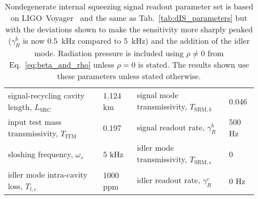 \begin{table}
\centering
\begin{tabular}{@{}ll|ll@{}}
\toprule
signal-recycling cavity length, $L_\text{SRC}$ & 1.124 km & signal mode transmissivity, $T_{\text{SRM},b}$ & 0.046 \\
input test mass transmissivity, $T_\text{ITM}$ & 0.197 & signal readout rate, $\gamma^b_R$ & 500 Hz \\
sloshing frequency, $\omega_s$ & 5 kHz & idler mode transmissivity, $T_{\text{SRM},c}$ & 0 \\
idler mode intra-cavity loss, $T_{l,c}$ & 1000 ppm & idler readout rate, $\gamma^c_R$ & 0 Hz \\ \bottomrule
\end{tabular}
\caption{Nondegenerate internal squeezing signal readout parameter set is based on LIGO~Voyager~\cite{LIGO_Voyager} and the same as Tab.~\ref{tab:dIS_parameters} but with the deviations shown to make the sensitivity more sharply peaked ($\gamma^b_R$ is now 0.5~kHz compared to 5~kHz) and the addition of the idler mode. Radiation pressure is included using $\rho\neq0$ from Eq.~\ref{eq:beta_and_rho} unless $\rho=0$ is stated. The results shown use these parameters unless stated otherwise.}
\label{tab:signal_RO_parameters}
\end{table}

